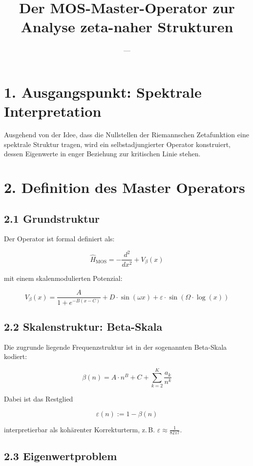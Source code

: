 \documentclass[12pt]{article}
\title{Der MOS-Master-Operator zur Analyse zeta-naher Strukturen}
\author{---}
\date{}
\begin{document}
\maketitle

\section*{1. Ausgangspunkt: Spektrale Interpretation}

Ausgehend von der Idee, dass die Nullstellen der Riemannschen Zetafunktion eine spektrale Struktur tragen, wird ein selbstadjungierter Operator konstruiert, dessen Eigenwerte in enger Beziehung zur kritischen Linie stehen.

\section*{2. Definition des Master Operators}

\subsection*{2.1 Grundstruktur}

Der Operator ist formal definiert als:

\[
\boxed{
\hat{H}_{\text{MOS}} = -\frac{d^2}{dx^2} + V_{\beta}(x)
}
\]

mit einem skalenmodulierten Potenzial:

\[
V_{\beta}(x) = \frac{A}{1 + e^{-B(x - C)}} + D \cdot \sin(\omega x) + \varepsilon \cdot \sin(\Omega \cdot \log(x))
\]

\subsection*{2.2 Skalenstruktur: Beta-Skala}

Die zugrunde liegende Frequenzstruktur ist in der sogenannten Beta-Skala kodiert:

\[
\beta(n) = A \cdot n^B + C + \sum_{k=2}^K \frac{a_k}{n^k}
\]

Dabei ist das Restglied

\[
\varepsilon(n) := 1 - \beta(n)
\]

interpretierbar als kohärenter Korrekturterm, z.\,B. \(\varepsilon \approx \frac{1}{8217}\).

\subsection*{2.3 Eigenwertproblem}
\end{document}
